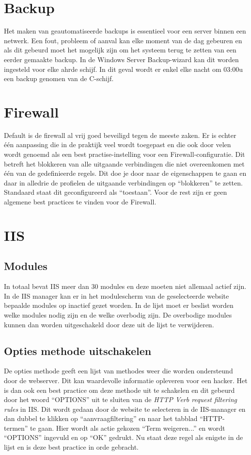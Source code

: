 \documentclass[pdftex,a4paper,12pt]{report}
\begin{document}
\section{Backup}
Het maken van geautomatiseerde backups is essentieel voor een server binnen een netwerk. Een fout, probleem of aanval kan elke moment van de dag gebeuren en als dit gebeurd moet het mogelijk zijn om het systeem terug te zetten van een eerder gemaakte backup. In de Windows Server Backup-wizard kan dit worden ingesteld voor elke ahrde schijf. In dit geval wordt er enkel elke nacht om 03:00u een backup genomen van de C-schijf. 

\section{Firewall}
Default is de firewall al vrij goed beveiligd tegen de meeste zaken. Er is echter één aanpassing die in de praktijk veel wordt toegepast en die ook door velen wordt genoemd als een best practise-instelling voor een Firewall-configuratie. Dit betreft het blokkeren van alle uitgaande verbindingen die niet overeenkomen met één van de gedefinieerde regels. Dit doe je door naar de eigenschappen te gaan en daar in alledrie de profielen de uitgaande verbindingen op "`blokkeren"' te zetten. Standaard staat dit geconfigureerd als "`toestaan"'. Voor de rest zijn er geen algemene best practices te vinden voor de Firewall.

\section{IIS}
\subsection{Modules}
In totaal bevat IIS meer dan 30 modules en deze moeten niet allemaal actief zijn. In de IIS manager kan er in het modulescherm van de geselecteerde website bepaalde modules op inactief gezet worden. In de lijst moet er beslist worden welke modules nodig zijn en de welke overbodig zijn. De overbodige modules kunnen dan worden uitgeschakeld door deze uit de lijst te verwijderen. 

\subsection{Opties methode uitschakelen}
De opties methode geeft een lijst van methodes weer die worden ondersteund door de webserver. Dit kan waardevolle informatie opleveren voor een hacker. Het is dan ook een best practice om deze methode uit te schakelen en dit gebeurd door het woord "`OPTIONS"' uit te sluiten van de \textit{HTTP Verb request filtering rules} in IIS. Dit wordt gedaan door de website te selecteren in de IIS-manager en dan dubbel te klikken op "`aanvraagfiltering"' en naar het tabblad "`HTTP-termen"' te gaan. Hier wordt als actie gekozen "`Term weigeren..."' en wordt "`OPTIONS"' ingevuld en op "`OK"' gedrukt. Nu staat deze regel als enigste in de lijst en is deze best practice in orde gebracht.
\end{document}
